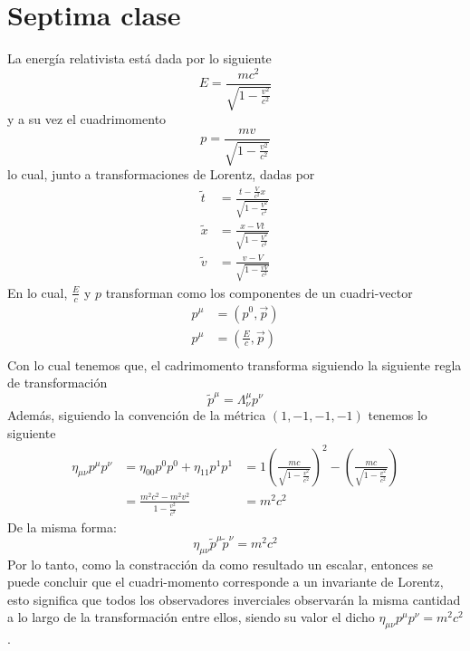 \documentclass[../main.tex]{subfiles}
\begin{document}
\section{Septima clase}
La energía relativista está dada por lo siguiente
\begin{equation}
  E = \frac{mc^2}{\sqrt{1-\frac{v^2}{c^2}}}
\end{equation}
y a su vez el cuadrimomento 
\begin{equation}
  p= \frac{mv}{\sqrt{1-\frac{v^2}{c^2}}}
\end{equation}
lo cual, junto a transformaciones de Lorentz, dadas por
\begin{align*}
  \tilde{t} & = \frac{t-\frac{V}{c^2} x}{\sqrt{1-\frac{V^2}{c^2}}} \\
  \tilde{x} & = \frac{x-Vt}{\sqrt{1-\frac{V^2}{c^2}}} \\
  \tilde{v} & = \frac{v-V}{\sqrt{1-\frac{vV}{c^2}}}
\end{align*}
En lo cual, $\frac{E}{c}$ y $p$ transforman como los componentes de un cuadri-vector
\begin{align*}
  p^\mu & = (p^0,\vec{p}) \\
  p^\mu & = \left( \frac{E}{c},\vec{p} \right) \\
\end{align*}
Con lo cual tenemos que, el cadrimomento transforma siguiendo la siguiente regla de transformación
\begin{equation}
  \tilde{p}^\mu=\Lambda_\nu^\mu p^\nu
\end{equation}
Además, siguiendo la convención de la métrica $(1,-1,-1,-1)$ tenemos lo siguiente
\begin{align*}
  \eta_{\mu \nu} p^\mu p^\nu  & = \eta_{00}p^0p^0 + \eta_{11}p^1p^1
  & = 1\left( \frac{mc}{\sqrt{1-\frac{v^2}{c^2}}}  \right)^2 - \left( \frac{mc}{\sqrt{1-\frac{v^2}{c^2}}} \right) \\
  & = \frac{m^2c^2-m^2v^2}{1-\frac{v^2}{c^2}}
  & = m^2c^2
\end{align*}
De la misma forma:
\begin{equation*}
  \eta_{\mu\nu}\tilde{p}^\mu\tilde{p}^\nu = m^2c^2
\end{equation*}
Por lo tanto, como la constracción da como resultado un escalar, entonces se puede concluir que el cuadri-momento corresponde a un invariante de Lorentz, esto significa que todos los observadores inverciales observarán la misma cantidad a lo largo de la transformación entre ellos, siendo su valor el dicho $\eta_{\mu\nu}p^\mu p^\nu=m^2c^2$. \\
\end{document}
